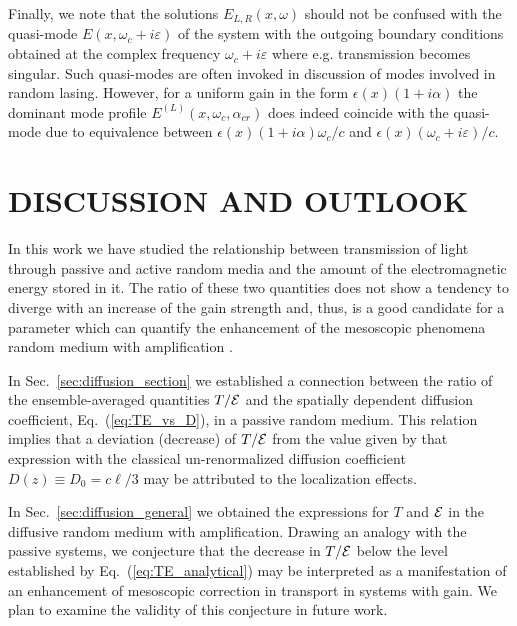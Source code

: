 Finally, we note that the solutions $E_{L,R}(x,\omega)$ should not be confused with the quasi-mode $E(x,\omega_c+i\varepsilon)$ of the system with the outgoing boundary conditions obtained at the complex frequency $\omega_c+i\varepsilon$ where e.g. transmission becomes singular. Such quasi-modes are often invoked in discussion of modes involved in random lasing. However, for a uniform gain in the form $\epsilon(x)(1+i\alpha)$ the dominant mode profile $E^{(L)}(x,\omega_c,\alpha_{cr})$ does indeed coincide with the quasi-mode due to equivalence between $\epsilon(x)(1+i\alpha)\omega_c/c$ and $\epsilon(x)(\omega_c+i\varepsilon)/c$.

\section{DISCUSSION AND OUTLOOK}
\label{sec:discussion_TE}

In this work we have studied the relationship between transmission of light through passive and active random media and the amount of the electromagnetic energy stored in it. The ratio of these two quantities does not show a tendency to diverge with an increase of the gain strength and, thus, is a good candidate for a parameter which can quantify the enhancement of the mesoscopic phenomena  random medium with amplification \cite{2004_Yamilov_intensity,2005_Yamilov_correlations,2006_Yamilov_conductance}. 

In Sec.~\ref{sec:diffusion_section} we established a connection between the ratio of the ensemble-averaged quantities $T/{\cal E}$ and the spatially dependent diffusion coefficient, Eq.~(\ref{eq:TE_vs_D}), in a passive random medium. This relation implies that a deviation (decrease) of $T/{\cal E}$ from the value given by that expression with the classical un-renormalized diffusion coefficient $D(z)\equiv D_0=c\ell/3$ may be attributed to the localization effects. 

In Sec.~\ref{sec:diffusion_general} we obtained the expressions for $T$ and ${\cal E}$ in the diffusive random medium with amplification. Drawing an analogy with the passive systems, we conjecture that the decrease in $T/{\cal E}$ below the level established by Eq.~(\ref{eq:TE_analytical}) may be interpreted as a manifestation of an enhancement of mesoscopic correction in transport in systems with gain. We plan to examine the validity of this conjecture in future work.

